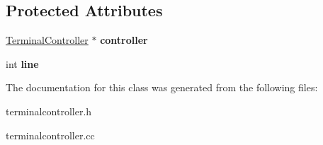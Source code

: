 \subsection*{Protected Attributes}
\begin{DoxyCompactItemize}
\item 
\hypertarget{classTerminalController_1_1DisplayDelay_aa03cf51bb4fdcaad09b8ee962f9e8c2e}{
\hyperlink{classTerminalController}{TerminalController} $\ast$ {\bfseries controller}}
\label{classTerminalController_1_1DisplayDelay_aa03cf51bb4fdcaad09b8ee962f9e8c2e}

\item 
\hypertarget{classTerminalController_1_1DisplayDelay_a4bf95671db0f400ac76617427e5fa0e9}{
int {\bfseries line}}
\label{classTerminalController_1_1DisplayDelay_a4bf95671db0f400ac76617427e5fa0e9}

\end{DoxyCompactItemize}


The documentation for this class was generated from the following files:\begin{DoxyCompactItemize}
\item 
terminalcontroller.h\item 
terminalcontroller.cc\end{DoxyCompactItemize}
